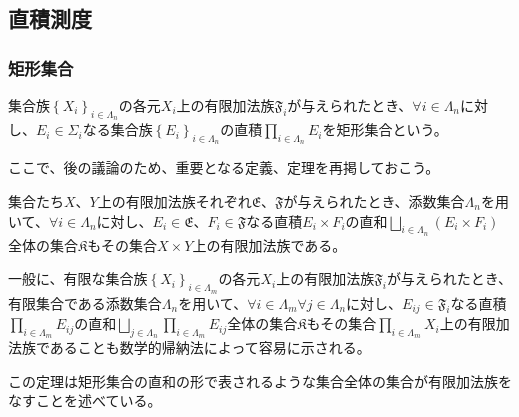 \documentclass[dvipdfmx]{jsarticle}
\begin{document}
\subsection{直積測度}%
\subsubsection{矩形集合}%
\begin{dfn} 
集合族$\left\{ X_{i} \right\}_{i \in \varLambda_{n} }$の各元$X_{i}$上の有限加法族$\mathfrak{F}_{i}$が与えられたとき、$\forall i \in \varLambda_{n}$に対し、$E_{i} \in \varSigma_{i}$なる集合族$\left\{ E_{i} \right\}_{i \in \varLambda_{n} }$の直積$\prod_{i \in \varLambda_{n} } E_{i}$を矩形集合という。
\end{dfn}\par
ここで、後の議論のため、重要となる定義、定理を再掲しておこう。
\begin{thm*}
集合たち$X$、$Y$上の有限加法族それぞれ$\mathfrak{E}$、$\mathfrak{F}$が与えられたとき、添数集合$\varLambda_{n}$を用いて、$\forall i \in \varLambda_{n}$に対し、$E_{i}\in \mathfrak{E}$、$F_{i}\in \mathfrak{F}$なる直積$E_{i} \times F_{i}$の直和$\bigsqcup_{i \in \varLambda_{n} } \left( E_{i} \times F_{i} \right)$全体の集合$\mathfrak{K}$もその集合$X \times Y$上の有限加法族である。\par
一般に、有限な集合族$\left\{ X_{i} \right\}_{i \in \varLambda_{m} }$の各元$X_{i}$上の有限加法族$\mathfrak{F}_{i}$が与えられたとき、有限集合である添数集合$\varLambda_{n}$を用いて、$\forall i \in \varLambda_{m}\forall j \in \varLambda_{n}$に対し、$E_{ij} \in \mathfrak{F}_{i}$なる直積$\prod_{i \in \varLambda_{m} } E_{ij}$の直和$\bigsqcup_{j \in \varLambda_{n} } {\prod_{i \in \varLambda_{m}} E_{ij}}$全体の集合$\mathfrak{K}$もその集合$\prod_{i \in \varLambda_{m}} X_{i}$上の有限加法族であることも数学的帰納法によって容易に示される。
\end{thm*}\par
この定理は矩形集合の直和の形で表されるような集合全体の集合が有限加法族をなすことを述べている。
\end{document}
